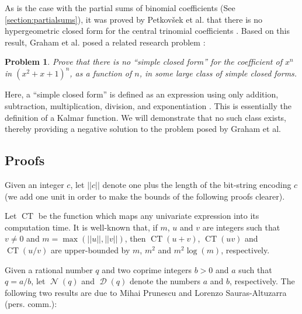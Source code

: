 \documentclass[10pt,a4paper]{article}
\theoremstyle{plain}
\DeclareMathOperator\CT{CT}
\DeclareMathOperator\num{\mathcal{N}}
\DeclareMathOperator\den{\mathcal{D}}
\newtheorem{problem}{Problem}[section]
\begin{document}
As is the case with the partial sums of binomial coefficients (See \cref{section:partialsums}), it was proved by Petkovšek et al. that there is no hypergeometric closed form for the central trinomial coefficients \cite{petkovsek1996ab}. Based on this result, Graham et al. posed a related research problem \cite{graham1994concrete}:
\begin{problem} \label{problem:grahametal}
Prove that there is no ``simple closed form'' for the coefficient of $x^n$ in $(x^2+x+1)^n$, as a function of $n$, in some large class of simple closed forms.
\end{problem}
Here, a ``simple closed form'' is defined as an expression using only addition, subtraction, multiplication, division, and exponentiation \cite{graham1994concrete}. This is essentially the definition of a Kalmar function. We will demonstrate that no such class exists, thereby providing a negative solution to the problem posed by Graham et al.

\subsection{Proofs}
Given an integer $ c $, let $ || c || $ denote one plus the length of the bit-string encoding $ c $ (we add one unit in order to make the bounds of the following proofs clearer).

Let $ \CT $ be the function which maps any univariate expression into its computation time. It is well-known that, if $ m $, $ u $ and $ v $ are integers such that $ v \neq 0 $ and $ m = \max ( || u || , || v || ) $, then $ \CT ( u + v ) $, $ \CT ( u v ) $ and $ \CT ( u / v ) $ are upper-bounded by $ m $, $ m^2 $ and $ m^2 \log ( m ) $, respectively.

Given a rational number $ q $ and two coprime integers $ b > 0 $ and $ a $ such that $ q = a / b $, let $ \num ( q ) $ and $ \den ( q ) $ denote the numbers $ a $ and $ b $, respectively.
\newpage
The following two results are due to Mihai Prunescu and Lorenzo Sauras-Altuzarra (pers. comm.):
\end{document}
